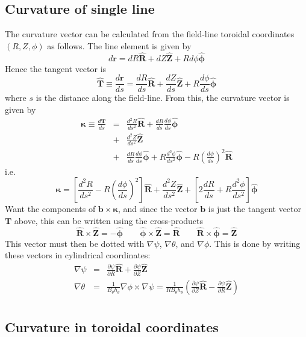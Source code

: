 \documentclass[12pt, a4paper]{article}
\newcommand{\dd}[2]{\ensuremath{\frac{d #1}{d #2}}}
\newcommand{\ddd}[2]{\ensuremath{\frac{d^2 #1}{d #2^2}}}
\newcommand{\deriv}[2]{\ensuremath{\frac{\partial #1}{\partial #2}}}
\newcommand{\hthe}{\ensuremath{h_\theta}}
\newcommand{\Bp}{\ensuremath{B_\theta}}
\newcommand{\Vec}[1]{\ensuremath{\mathbf{#1}}}
\newcommand{\kvec}{\Vec{\kappa}}
\newcommand{\Rvec}{\ensuremath{\hat{\Vec{R}}}}
\newcommand{\Zvec}{\ensuremath{\hat{\Vec{Z}}}}
\newcommand{\phivec}{\ensuremath{\hat{\Vec{\phi}}}}
\begin{document}
\subsection{Curvature of single line}

The curvature vector can be calculated from the field-line toroidal
coordinates $\left(R,Z,\phi\right)$ as follows. The line element
is given by
\[
d\Vec{r} = dR\Rvec + dZ\Zvec + Rd\phi\phivec
\]
Hence the tangent vector is
\[
\hat{\Vec{T}} \equiv \dd{\Vec{r}}{s} = \dd{R}{s}\Rvec + \dd{Z}{s}\Zvec + R\dd{\phi}{s}\phivec
\]
where $s$ is the distance along the field-line. From this, the curvature vector
is given by
\begin{eqnarray*}
\kvec \equiv \dd{\Vec{T}}{s} &=& \ddd{R}{s}\Rvec + \dd{R}{s}\dd{\phi}{s}\phivec \\
&+& \ddd{Z}{s}\Zvec \\
&+& \dd{R}{s}\dd{\phi}{s}\phivec + R\ddd{\phi}{s}\phivec - R\left(\dd{\phi}{s}\right)^2 \Rvec
\end{eqnarray*}
i.e.
\begin{equation}
\kvec = \left[\ddd{R}{s} - R\left(\dd{\phi}{s}\right)^2\right]\Rvec + \ddd{Z}{s}\Zvec + \left[2\dd{R}{s} + R\ddd{\phi}{s}\right]\phivec
\label{eq:kappaline}
\end{equation}
Want the components of $\Vec{b}\times\kvec$, and since the vector $\Vec{b}$
is just the tangent vector $\Vec{T}$ above, this can be written using the
cross-products
\[
\Rvec\times\Zvec = -\phivec \qquad \phivec\times\Zvec = \Rvec \qquad \Rvec\times\phivec = \Zvec
\]
This vector must then be dotted with $\nabla\psi$, $\nabla\theta$, and $\nabla\phi$. This is done by writing these vectors in cylindrical coordinates:
\begin{eqnarray*}
\nabla\psi &=& \deriv{\psi}{R}\hat{\Vec{R}} + \deriv{\psi}{Z}\hat{\Vec{Z}} \\
\nabla\theta &=& \frac{1}{\Bp\hthe}\nabla\phi\times\nabla\psi = \frac{1}{R\Bp\hthe}\left(\deriv{\psi}{Z}\hat{\Vec{R}} - \deriv{\psi}{R}\hat{\Vec{Z}}\right) \\
\end{eqnarray*}

\subsection{Curvature in toroidal coordinates}
\end{document}
